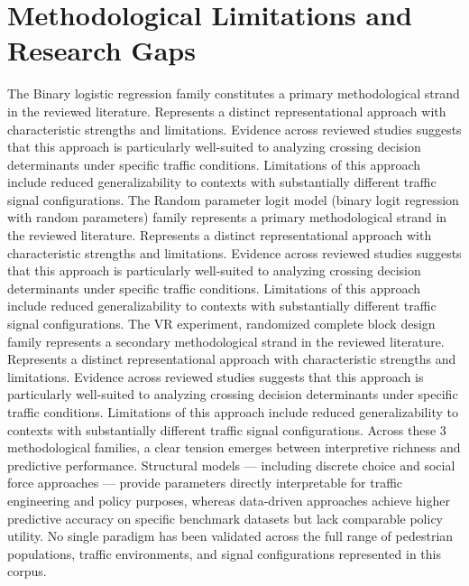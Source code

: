 \documentclass{article}
\begin{document}
\section{Methodological Limitations and Research Gaps}
The Binary logistic regression family constitutes a primary methodological strand in the reviewed literature. Represents a distinct representational approach with characteristic strengths and limitations. Evidence across reviewed studies suggests that this approach is particularly well-suited to analyzing crossing decision determinants under specific traffic conditions. Limitations of this approach include reduced generalizability to contexts with substantially different traffic signal configurations. The Random parameter logit model (binary logit regression with random parameters) family represents a primary methodological strand in the reviewed literature. Represents a distinct representational approach with characteristic strengths and limitations. Evidence across reviewed studies suggests that this approach is particularly well-suited to analyzing crossing decision determinants under specific traffic conditions. Limitations of this approach include reduced generalizability to contexts with substantially different traffic signal configurations. The VR experiment, randomized complete block design family represents a secondary methodological strand in the reviewed literature. Represents a distinct representational approach with characteristic strengths and limitations. Evidence across reviewed studies suggests that this approach is particularly well-suited to analyzing crossing decision determinants under specific traffic conditions. Limitations of this approach include reduced generalizability to contexts with substantially different traffic signal configurations. Across these 3 methodological families, a clear tension emerges between interpretive richness and predictive performance. Structural models — including discrete choice and social force approaches — provide parameters directly interpretable for traffic engineering and policy purposes, whereas data-driven approaches achieve higher predictive accuracy on specific benchmark datasets but lack comparable policy utility. No single paradigm has been validated across the full range of pedestrian populations, traffic environments, and signal configurations represented in this corpus.
\end{document}
